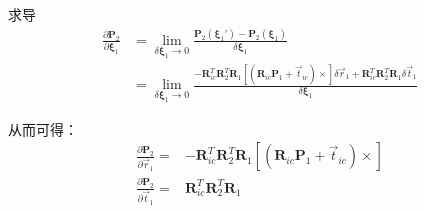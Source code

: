 \documentclass{article}
\begin{document}
求导
$$
\begin{aligned}
	\frac{\partial{\boldsymbol{P}_2}}{\partial{\boldsymbol{\xi}_1}} & = 
	\lim_{\delta\boldsymbol{\xi}_1\rightarrow0}
	\frac{\boldsymbol{P}_2(\boldsymbol{\xi}_1')- \boldsymbol{P}_2(\boldsymbol{\xi}_1)}
	{\delta\boldsymbol{\xi}_1}
	\\&=
	\lim_{\delta\boldsymbol{\xi}_1\rightarrow0}
	\frac{-\boldsymbol{R}_{ic}^T\boldsymbol{R}_2^{T}\boldsymbol{R}_1[(\boldsymbol{R}_{ic}\boldsymbol{P}_1+\vec{t}_{ic})\times]\delta\vec{r}_1+
	\boldsymbol{R}_{ic}^T\boldsymbol{R}_2^{T}\boldsymbol{R}_1\delta\vec{t}_1}
	{\delta\boldsymbol{\xi}_1}
\end{aligned}
$$

从而可得：
\begin{equation}
	\begin{aligned}
		\frac{\partial{\boldsymbol{P}_2}}{\partial{\vec{r}_1}}= & -\boldsymbol{R}_{ic}^T\boldsymbol{R}_2^{T}\boldsymbol{R}_1[(\boldsymbol{R}_{ic}\boldsymbol{P}_1+\vec{t}_{ic})\times] \\
		\frac{\partial{\boldsymbol{P}_2}}{\partial{\vec{t}_1}}= & \boldsymbol{R}_{ic}^T\boldsymbol{R}_2^{T}\boldsymbol{R}_1                                                            
	\end{aligned}
\end{equation}
\end{document}
